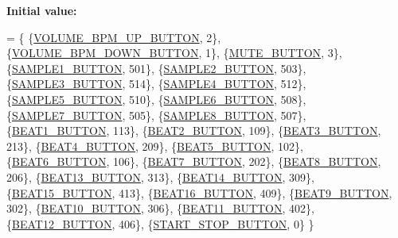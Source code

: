 {\bfseries Initial value\+:}
\begin{DoxyCode}
= \{
            \{\hyperlink{namespaceinputs_ab1d58fe937ccabff6ec4011a74028bfb}{VOLUME\_BPM\_UP\_BUTTON},   2\},
            \{\hyperlink{namespaceinputs_af3cad6ab00b2670e1710698945d28c17}{VOLUME\_BPM\_DOWN\_BUTTON}, 1\},
            \{\hyperlink{namespaceinputs_af0075a72395787966efcec2403306b43}{MUTE\_BUTTON},            3\},
            \{\hyperlink{namespaceinputs_a39dbaf6935309e198c1a0bc6e3468c45}{SAMPLE1\_BUTTON},         501\},
            \{\hyperlink{namespaceinputs_afcf2086c7f58f801e5654d8e573d928c}{SAMPLE2\_BUTTON},         503\},
            \{\hyperlink{namespaceinputs_a17158d35ca30fb91c6f9f757ce0d7ccc}{SAMPLE3\_BUTTON},         514\},
            \{\hyperlink{namespaceinputs_ac9ccac580f0955e454a367ddc6421d78}{SAMPLE4\_BUTTON},         512\},
            \{\hyperlink{namespaceinputs_ad22ade847b4a38fd418dccda07814551}{SAMPLE5\_BUTTON},         510\},
            \{\hyperlink{namespaceinputs_a88edcfa8b89df1abcca33bcec05974c4}{SAMPLE6\_BUTTON},         508\},
            \{\hyperlink{namespaceinputs_a50972dcf524a7b7c420ca75b0ba72a29}{SAMPLE7\_BUTTON},         505\},
            \{\hyperlink{namespaceinputs_a85f389284c616cd584390d04ad192ced}{SAMPLE8\_BUTTON},         507\},
            \{\hyperlink{namespaceinputs_af62021422f469c370f42c78a72504a66}{BEAT1\_BUTTON},           113\},
            \{\hyperlink{namespaceinputs_a8cdd33c9e53b617a2cf8bd32a5b74484}{BEAT2\_BUTTON},           109\},
            \{\hyperlink{namespaceinputs_ab60a6fc2188a034f76d3fbe554efe314}{BEAT3\_BUTTON},           213\},
            \{\hyperlink{namespaceinputs_af65f26f63a9572003a2bc49e7955e319}{BEAT4\_BUTTON},           209\},
            \{\hyperlink{namespaceinputs_a8a027829529daa53a24ece7b8334164b}{BEAT5\_BUTTON},           102\},
            \{\hyperlink{namespaceinputs_a6afdc23bce21454342081cf937e47ab9}{BEAT6\_BUTTON},           106\},
            \{\hyperlink{namespaceinputs_ac74e302394a578b31f0cf44df8cbb1a9}{BEAT7\_BUTTON},           202\},
            \{\hyperlink{namespaceinputs_abfcd4d28221c436391131a27402ea620}{BEAT8\_BUTTON},           206\},
            \{\hyperlink{namespaceinputs_a8f9d547eaa8c52cebfa64221341f266a}{BEAT13\_BUTTON},          313\},
            \{\hyperlink{namespaceinputs_a4dfd34a5656f72c71f1b2dd8efc963dc}{BEAT14\_BUTTON},          309\},
            \{\hyperlink{namespaceinputs_a1952aa2d27b65c8d8899a1ae1cfb7bb9}{BEAT15\_BUTTON},          413\},
            \{\hyperlink{namespaceinputs_af0f3099a06352ba4eb0808091b908178}{BEAT16\_BUTTON},          409\},
            \{\hyperlink{namespaceinputs_af628ea84bf7114a62249d4bb425ed06a}{BEAT9\_BUTTON},           302\},
            \{\hyperlink{namespaceinputs_a9778bcf3a44a9d16ae156bac6d745a24}{BEAT10\_BUTTON},          306\},
            \{\hyperlink{namespaceinputs_ad09e4010a8b08721988599b198645372}{BEAT11\_BUTTON},          402\},
            \{\hyperlink{namespaceinputs_a7b6bb44b9241cac31ff9909c3fc88271}{BEAT12\_BUTTON},          406\},
            \{\hyperlink{namespaceinputs_ab1d04ae8b7a7f4d11849c110f20fae10}{START\_STOP\_BUTTON},      0\}
    \}
\end{DoxyCode}


